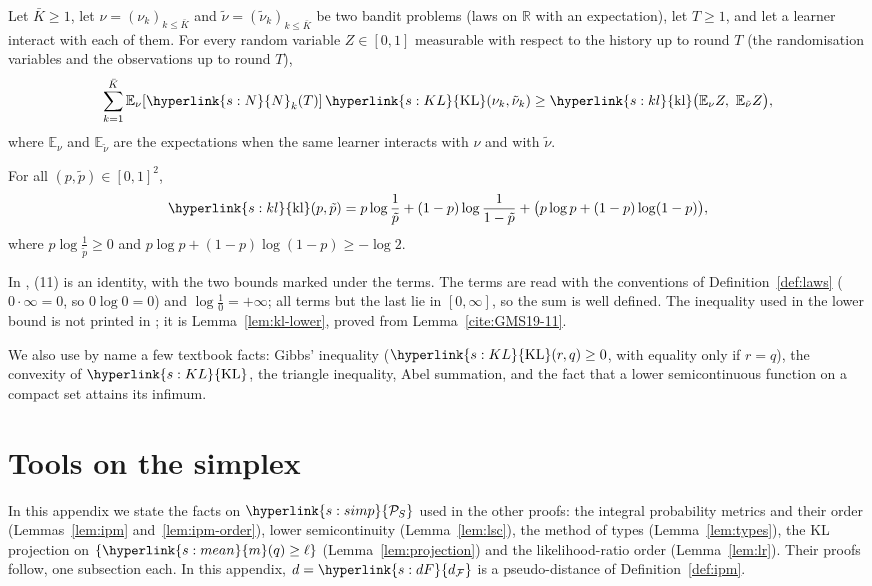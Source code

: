 \documentclass[11pt]{article}
\newcommand{\E}{\mathbb{E}}
\newcommand{\sy}[2]{{\hyperlink{#1}{#2}}}
\newcommand{\Simp}{\sy{s:simp}{\mathcal{P}_{S}}}
\newcommand{\mean}{\sy{s:mean}{m}}
\newcommand{\KL}{\sy{s:KL}{\mathrm{KL}}}
\newcommand{\dF}{\sy{s:dF}{d_{\mathcal F}}}
\newcommand{\Nc}{\sy{s:N}{N}}
\newcommand{\kl}{\sy{s:kl}{\mathrm{kl}}}
\begin{document}
\begin{lemma}\label{cite:GMS19-6}
Let $\bar K\ge1$, let $\nu=(\nu_k)_{k\le\bar K}$ and $\tilde\nu=(\tilde\nu_k)_{k\le\bar K}$ be two
bandit problems (laws on $\mathbb R$ with an expectation), let $T\ge1$, and let a learner interact
with each of them. For every random variable $Z\in[0,1]$ measurable with respect to the history up
to round $T$ (the randomisation variables and the observations up to round $T$),
\begin{equation*}
\sum_{k=1}^{\bar K}\E_\nu[\Nc_k(T)]\,\KL(\nu_k,\tilde\nu_k)\ge\kl\big(\E_\nu Z,\ \E_{\tilde\nu}Z\big),
\end{equation*}
where $\E_\nu$ and $\E_{\tilde\nu}$ are the expectations when the same learner interacts with $\nu$
and with $\tilde\nu$.
\end{lemma}

\begin{lemma}\label{cite:GMS19-11}
For all $(p,\tilde p)\in[0,1]^2$,
\begin{equation*}
\kl(p,\tilde p)=p\log\frac1{\tilde p}+(1-p)\log\frac1{1-\tilde p}+\big(p\log p+(1-p)\log(1-p)\big),
\end{equation*}
where $p\log\frac1{\tilde p}\ge0$ and $p\log p+(1-p)\log(1-p)\ge-\log2$.
\end{lemma}

In \citet{GMS19}, (11) is an identity, with the two bounds marked under the terms. The terms are
read with the conventions of Definition~\ref{def:laws} ($0\cdot\infty=0$, so $0\log0=0$) and
$\log\frac10=+\infty$; all terms but the last lie in $[0,\infty]$, so the sum is well defined. The
inequality used in the lower bound is not printed in \citet{GMS19}; it is Lemma~\ref{lem:kl-lower},
proved from Lemma~\ref{cite:GMS19-11}.

We also use by name a few textbook facts: Gibbs' inequality ($\KL(r,q)\ge0$, with equality only if
$r=q$), the convexity of $\KL$, the triangle inequality, Abel summation, and the fact that a lower
semicontinuous function on a compact set attains its infimum.

\section{Tools on the simplex}\label{sec:proofs}

In this appendix we state the facts on $\Simp$ used in the other proofs: the integral probability
metrics and their order (Lemmas~\ref{lem:ipm} and~\ref{lem:ipm-order}), lower semicontinuity
(Lemma~\ref{lem:lsc}), the method of types (Lemma~\ref{lem:types}), the KL projection on
$\{\mean(q)\ge\ell\}$ (Lemma~\ref{lem:projection}) and the likelihood-ratio order (Lemma~\ref{lem:lr}).
Their proofs follow, one subsection each. In this appendix, $d=\dF$ is a pseudo-distance
of Definition~\ref{def:ipm}.
\end{document}
